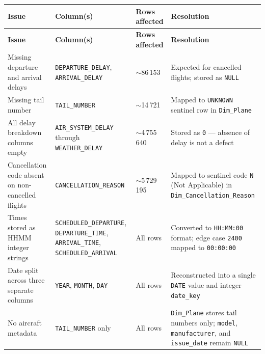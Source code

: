 \documentclass[12pt,a4paper]{article}
\begin{document}
\begin{longtable}{>{\raggedright\arraybackslash}p{4.5cm}
                  >{\raggedright\arraybackslash}p{3.5cm}
                  >{\raggedright\arraybackslash}p{2cm}
                  >{\raggedright\arraybackslash}p{4.5cm}}
\toprule
\textbf{Issue} & \textbf{Column(s)} & \textbf{Rows affected} & \textbf{Resolution} \\
\midrule
\endfirsthead
\toprule
\textbf{Issue} & \textbf{Column(s)} & \textbf{Rows affected} & \textbf{Resolution} \\
\midrule
\endhead
\bottomrule
\endfoot

Missing departure and arrival delays &
\texttt{DEPARTURE\_DELAY}, \texttt{ARRIVAL\_DELAY} &
{\raise0pt\hbox{$\sim$}}86\,153 &
Expected for cancelled flights; stored as \texttt{NULL} \\[4pt]

Missing tail number &
\texttt{TAIL\_NUMBER} &
{\raise0pt\hbox{$\sim$}}14\,721 &
Mapped to \texttt{UNKNOWN} sentinel row in \texttt{Dim\_Plane} \\[4pt]

All delay breakdown columns empty &
\texttt{AIR\_SYSTEM\_DELAY} through \texttt{WEATHER\_DELAY} &
{\raise0pt\hbox{$\sim$}}4\,755\,640 &
Stored as \texttt{0} — absence of delay is not a defect \\[4pt]

Cancellation code absent on non-cancelled flights &
\texttt{CANCELLATION\_REASON} &
{\raise0pt\hbox{$\sim$}}5\,729\,195 &
Mapped to sentinel code \texttt{N} (Not Applicable) in \texttt{Dim\_Cancellation\_Reason} \\[4pt]

Times stored as HHMM integer strings &
\texttt{SCHEDULED\_DEPARTURE}, \texttt{DEPARTURE\_TIME}, \texttt{ARRIVAL\_TIME}, \texttt{SCHEDULED\_ARRIVAL} &
All rows &
Converted to \texttt{HH:MM:00} format; edge case \texttt{2400} mapped to \texttt{00:00:00} \\[4pt]

Date split across three separate columns &
\texttt{YEAR}, \texttt{MONTH}, \texttt{DAY} &
All rows &
Reconstructed into a single \texttt{DATE} value and integer \texttt{date\_key} \\[4pt]

No aircraft metadata &
\texttt{TAIL\_NUMBER} only &
All rows &
\texttt{Dim\_Plane} stores tail numbers only; \texttt{model}, \texttt{manufacturer}, and \texttt{issue\_date} remain \texttt{NULL} \\

\end{longtable}
\end{document}
